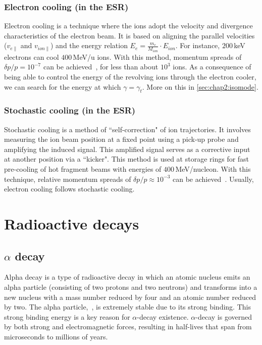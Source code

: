 \subsubsection{Electron cooling (in the \textsc{ESR})}\label{subsubsec:intro:ecooling}

Electron cooling is a technique where the ions adopt the velocity and divergence characteristics of the electron beam. It is based on aligning the parallel velocities ($v_{e\parallel}$ and $v_{ion\parallel}$) and the energy relation $E_{e} = \frac{m_{e}}{M_{ion}} \cdot E_{ion}$. For instance, $200$\,keV electrons can cool $400$\,MeV/u ions. With this method, momentum spreads of \,$\delta p/p = 10^{-7}$ can be achieved~\cite{ecoolSteck}, for less than about $10^3$ ions.
\newpar
As a consequence of being able to control the energy of the revolving ions through the electron cooler, we can search for the energy at which $\gamma = \gamma_t$. More on this in \cref{sec:chap2:isomode}.
\subsubsection{Stochastic cooling (in the \textsc{ESR})}\label{subsubsec:intro:scooling}
Stochastic cooling is a method of ``self-correction" of ion trajectories. It involves measuring the ion beam position at a fixed point using a pick-up probe and amplifying the induced signal. This amplified signal serves as a corrective input at another position via a ``kicker". This method is used at storage rings for fast pre-cooling of hot fragment beams with energies of $400$\,MeV/nucleon. With this technique, relative momentum spreads of $\delta p/p \approx 10^{-3}$ can be achieved~\cite{stochasticESR}. Usually, electron cooling follows stochastic cooling.

\section{Radioactive decays}\label{sec:intro:radioactive_decays}
\subsection{$\alpha$ decay}\label{subsec:intro:alphad}
Alpha decay is a type of radioactive decay in which an atomic nucleus emits an alpha particle (consisting of two protons and two neutrons) and transforms into a new nucleus with a mass number reduced by four and an atomic number reduced by two. 
The alpha particle, \,, is extremely stable due to its strong binding. This strong binding energy is a key reason for $\alpha$-decay existence. $\alpha$-decay is governed by both strong and electromagnetic forces, resulting in half-lives that span from microseconds to millions of years.

